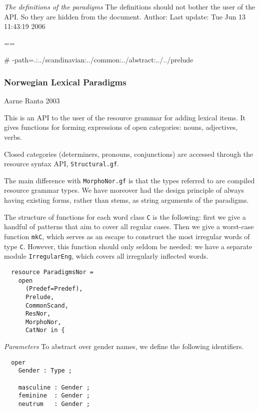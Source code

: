 \documentclass[11pt,a4paper]{article}
\newcommand{\commOut}[1]{}
\newcommand{\subsubsubsection}[1]{\textit{#1}}
\begin{document}
\subsubsubsection{The definitions of the paradigms}
The definitions should not bother the user of the API. So they are
hidden from the document.
Author: 
Last update: Tue Jun 13 11:43:19 2006

\commOut{Produced by 
gfdoc - a rudimentary GF document generator.
(c) Aarne Ranta (\htmladdnormallink{aarne@cs.chalmers.se}{mailto:aarne@cs.chalmers.se}) 2002 under GNU GPL.}

==

\# -path=.:../scandinavian:../common:../abstract:../../prelude


\subsubsection{Norwegian Lexical Paradigms}
Aarne Ranta 2003

This is an API to the user of the resource grammar 
for adding lexical items. It gives functions for forming
expressions of open categories: nouns, adjectives, verbs.

Closed categories (determiners, pronouns, conjunctions) are
accessed through the resource syntax API, \texttt{Structural.gf}. 

The main difference with \texttt{MorphoNor.gf} is that the types
referred to are compiled resource grammar types. We have moreover
had the design principle of always having existing forms, rather
than stems, as string arguments of the paradigms.

The structure of functions for each word class \texttt{C} is the following:
first we give a handful of patterns that aim to cover all
regular cases. Then we give a worst-case function \texttt{mkC}, which serves as an
escape to construct the most irregular words of type \texttt{C}.
However, this function should only seldom be needed: we have a
separate module \texttt{IrregularEng}, which covers all irregularly inflected
words.

\begin{verbatim}
  resource ParadigmsNor = 
    open 
      (Predef=Predef), 
      Prelude, 
      CommonScand, 
      ResNor, 
      MorphoNor, 
      CatNor in {
\end{verbatim}

\subsubsubsection{Parameters}
To abstract over gender names, we define the following identifiers.

\begin{verbatim}
  oper
    Gender : Type ; 
  
    masculine : Gender ;
    feminine  : Gender ;
    neutrum   : Gender ;
\end{verbatim}
\end{document}
